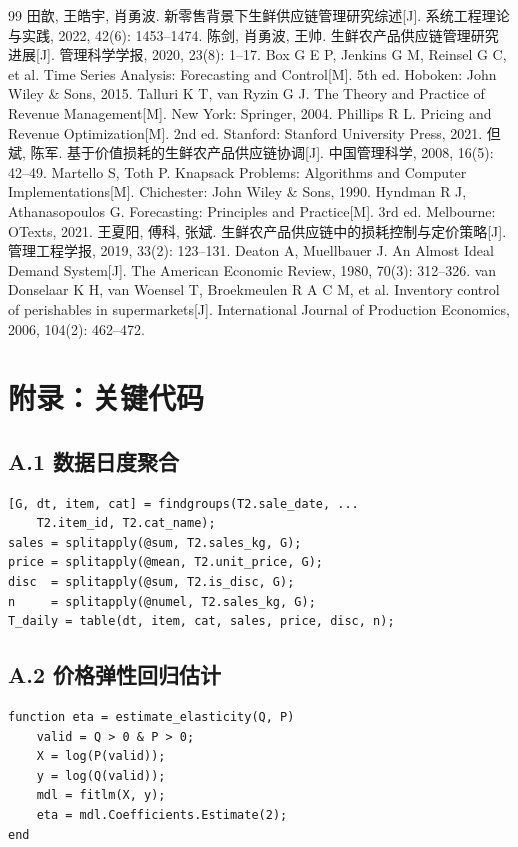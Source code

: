 \documentclass[12pt,a4paper]{ctexart}
\begin{document}
\begin{thebibliography}{99}
\setlength{\itemsep}{0pt}
 田歆, 王皓宇, 肖勇波. 新零售背景下生鲜供应链管理研究综述[J]. 系统工程理论与实践, 2022, 42(6): 1453--1474.
 陈剑, 肖勇波, 王帅. 生鲜农产品供应链管理研究进展[J]. 管理科学学报, 2020, 23(8): 1--17.
 Box G E P, Jenkins G M, Reinsel G C, et al. Time Series Analysis: Forecasting and Control[M]. 5th ed. Hoboken: John Wiley \& Sons, 2015.
 Talluri K T, van Ryzin G J. The Theory and Practice of Revenue Management[M]. New York: Springer, 2004.
 Phillips R L. Pricing and Revenue Optimization[M]. 2nd ed. Stanford: Stanford University Press, 2021.
 但斌, 陈军. 基于价值损耗的生鲜农产品供应链协调[J]. 中国管理科学, 2008, 16(5): 42--49.
 Martello S, Toth P. Knapsack Problems: Algorithms and Computer Implementations[M]. Chichester: John Wiley \& Sons, 1990.
 Hyndman R J, Athanasopoulos G. Forecasting: Principles and Practice[M]. 3rd ed. Melbourne: OTexts, 2021.
 王夏阳, 傅科, 张斌. 生鲜农产品供应链中的损耗控制与定价策略[J]. 管理工程学报, 2019, 33(2): 123--131.
 Deaton A, Muellbauer J. An Almost Ideal Demand System[J]. The American Economic Review, 1980, 70(3): 312--326.
 van Donselaar K H, van Woensel T, Broekmeulen R A C M, et al. Inventory control of perishables in supermarkets[J]. International Journal of Production Economics, 2006, 104(2): 462--472.
\end{thebibliography}

\newpage

\section*{附录：关键代码}

\subsection*{A.1 数据日度聚合}
\begin{lstlisting}
[G, dt, item, cat] = findgroups(T2.sale_date, ...
    T2.item_id, T2.cat_name);
sales = splitapply(@sum, T2.sales_kg, G);
price = splitapply(@mean, T2.unit_price, G);
disc  = splitapply(@sum, T2.is_disc, G);
n     = splitapply(@numel, T2.sales_kg, G);
T_daily = table(dt, item, cat, sales, price, disc, n);
\end{lstlisting}

\subsection*{A.2 价格弹性回归估计}
\begin{lstlisting}
function eta = estimate_elasticity(Q, P)
    valid = Q > 0 & P > 0;
    X = log(P(valid));
    y = log(Q(valid));
    mdl = fitlm(X, y);
    eta = mdl.Coefficients.Estimate(2);
end
\end{lstlisting}
\end{document}
